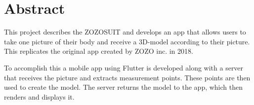 \chapter*{Abstract}
\label{ch:abstract}

This project describes the ZOZOSUIT and develops an app that allows users to take one picture of their body and receive a 3D-model according to their picture. \newline
This replicates the original app created by ZOZO inc. in 2018. 

To accomplish this a mobile app using Flutter is developed along with a server that receives the picture and extracts measurement points. These points are then used to create the model. \newline
The server returns the model to the app, which then renders and displays it.